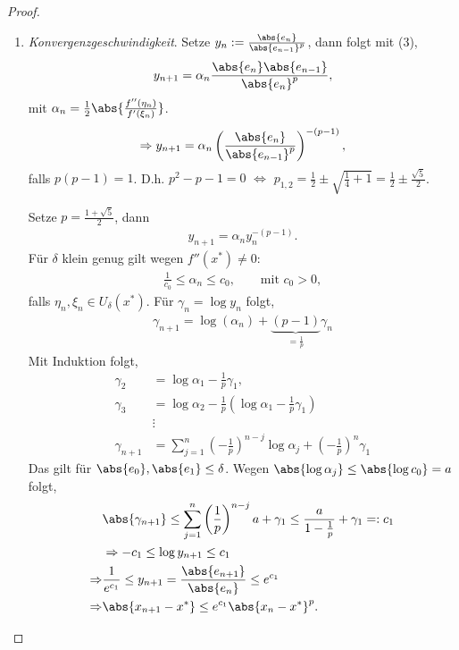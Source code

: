 \begin{proof}
\begin{enumerate}[label=\arabic{*})]
\item
\textit{Konvergenzgeschwindigkeit}. Setze $y_n :=
\frac{\abs{e_n}}{\abs{e_{n-1}}^p}$, dann folgt mit (3),
\begin{align*}
y_{n+1}=\alpha_n \frac{\abs{e_n}\abs{e_{n-1}}}{\abs{e_{n}}^p},
\end{align*}
mit $\alpha_n = \frac{1}{2}\abs{\frac{f''(\eta_n)}{f'(\xi_n)}}$.
\begin{align*}
\Rightarrow y_{n+1} = \alpha_n \left( \frac{\abs{e_n}}{\abs{e_{n-1}}^p}
\right)^{-(p-1)},
\end{align*}
falls $p(p-1)=1$. D.h. $p^2 -p - 1= 0$ $\Leftrightarrow $ $p_{1,2} =
\frac{1}{2}\pm \sqrt{\frac{1}{4}+1} = \frac{1}{2}\pm \frac{\sqrt{5}}{2}$.

Setze $p=\frac{1+\sqrt{5}}{2}$, dann
\begin{align*}
y_{n+1} = \alpha_n y_n^{-(p-1)}.
\end{align*}
Für $\delta$ klein genug gilt wegen $f''(x^*)\neq 0$:
\begin{align*}
\frac{1}{c_0} \le \alpha_n \le c_0,\qquad \text{mit } c_0 > 0,
\end{align*}
falls $\eta_n,\xi_n\in U_\delta(x^*)$.
Für $\gamma_n = \log y_n$ folgt,
\begin{align*}
\gamma_{n+1} = \log (\alpha_n) + \underbrace{(p-1)}_{=\frac{1}{p}}\gamma_n
\end{align*}
Mit Induktion folgt,
\begin{align*}
\gamma_2 &= \log \alpha_1 - \frac{1}{p}\gamma_1,\\
\gamma_3 &= \log \alpha_2 - \frac{1}{p}\left(\log \alpha_1 -
\frac{1}{p}\gamma_1\right)\\
&\vdots\\
\gamma_{n+1} &=  \sum\limits_{j=1}^n \left(-\frac{1}{p}\right)^{n-j}
\log\alpha_j + \left(-\frac{1}{p}\right)^n\gamma_1
\end{align*}
Das gilt für $\abs{e_0},\abs{e_1}\le \delta$. Wegen $\abs{\log\alpha_j}\le
\abs{\log c_0} = a$ folgt,
\begin{align*}
&\abs{\gamma_{n+1}} \le \sum\limits_{j=1}^n \left(\frac{1}{p}\right)^{n-j}a +
\gamma_1 \le \frac{a}{1-\frac{1}{p}} + \gamma_1 =: c_1\\
&\Rightarrow -c_1 \le \log y_{n+1} \le c_1\\
\Rightarrow &\frac{1}{e^{c_1}} \le y_{n+1} =
\frac{\abs{e_{n+1}}}{\abs{e_n}}\le e^{c_1}\\ \Rightarrow &\abs{x_{n+1}-x^*} \le
e^{c_1}\abs{x_n-x^*}^p.\qedhere \end{align*}
\end{enumerate}
\end{proof}


